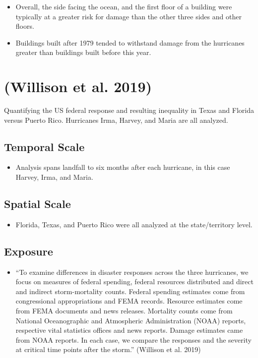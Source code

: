 \documentclass[
]{article}
\providecommand{\tightlist}{%
  \setlength{\itemsep}{0pt}\setlength{\parskip}{0pt}}
\begin{document}
\begin{itemize}
\tightlist
\item
  Overall, the side facing the ocean, and the first floor of a building
  were typically at a greater risk for damage than the other three sides
  and other floors.
\item
  Buildings built after 1979 tended to withstand damage from the
  hurricanes greater than buildings built before this year.
\end{itemize}

\hypertarget{willison2019quantifying}{%
\section{(Willison et al. 2019)}\label{willison2019quantifying}}

Quantifying the US federal response and resulting inequality in Texas
and Florida versus Puerto Rico. Hurricanes Irma, Harvey, and Maria are
all analyzed.

\hypertarget{temporal-scale-24}{%
\subsection{Temporal Scale}\label{temporal-scale-24}}

\begin{itemize}
\tightlist
\item
  Analysis spans landfall to six months after each hurricane, in this
  case Harvey, Irma, and Maria.
\end{itemize}

\hypertarget{spatial-scale-24}{%
\subsection{Spatial Scale}\label{spatial-scale-24}}

\begin{itemize}
\tightlist
\item
  Florida, Texas, and Puerto Rico were all analyzed at the
  state/territory level.
\end{itemize}

\hypertarget{exposure-23}{%
\subsection{Exposure}\label{exposure-23}}

\begin{itemize}
\tightlist
\item
  ``To examine differences in disaster responses across the three
  hurricanes, we focus on measures of federal spending, federal
  resources distributed and direct and indirect storm-mortality counts.
  Federal spending estimates come from congressional appropriations and
  FEMA records. Resource estimates come from FEMA documents and news
  releases. Mortality counts come from National Oceanographic and
  Atmospheric Administration (NOAA) reports, respective vital statistics
  offices and news reports. Damage estimates came from NOAA reports. In
  each case, we compare the responses and the severity at critical time
  points after the storm.'' (Willison et al. 2019)
\end{itemize}
\end{document}
